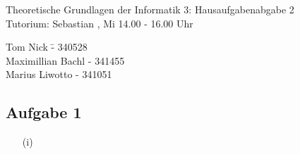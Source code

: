 \documentclass[a4paper,10pt]{article}
\begin{document}
\begin{center}
\Large{Theoretische Grundlagen der Informatik 3: Hausaufgabenabgabe 2} \\
\large{Tutorium: Sebastian , Mi 14.00 - 16.00 Uhr}
\end{center}
\begin{tabbing}
Tom Nick \hspace{2cm}\= - 340528\\
Maximillian Bachl \> - 341455 \\
Marius Liwotto\> -  341051
\end{tabbing}
	\subsection*{Aufgabe 1}

	\begin{enumerate}
	\item[(i)]
%	
%	
%	
%	
%		
%		

\end{enumerate}
\end{document}
